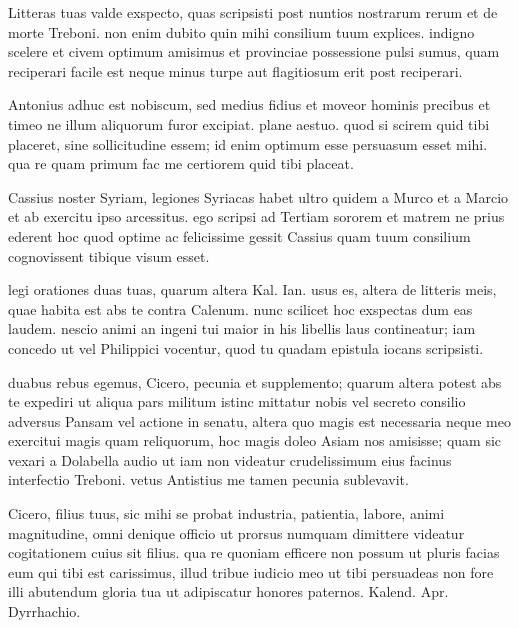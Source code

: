 


 Litteras tuas valde exspecto, quas scripsisti post nuntios nostrarum rerum et de morte Treboni. non enim dubito quin mihi consilium tuum explices. indigno scelere et civem optimum amisimus et provinciae possessione pulsi sumus, quam reciperari facile est neque minus turpe aut flagitiosum erit post reciperari.

 Antonius adhuc est nobiscum, sed medius fidius et moveor hominis precibus et timeo ne illum aliquorum furor excipiat. plane aestuo. quod si scirem quid tibi placeret, sine sollicitudine essem; id enim optimum esse persuasum esset mihi. qua re quam primum fac me certiorem quid tibi placeat.

 Cassius noster Syriam, legiones Syriacas habet ultro quidem a Murco et a Marcio et ab exercitu ipso arcessitus. ego scripsi ad Tertiam sororem et matrem ne prius ederent hoc quod optime ac felicissime gessit Cassius quam tuum consilium cognovissent tibique visum esset.

 legi orationes duas tuas, quarum altera Kal. Ian. usus es, altera de litteris meis, quae habita est abs te contra Calenum. nunc scilicet hoc exspectas dum eas laudem. nescio animi an ingeni tui maior in his libellis laus contineatur; iam concedo ut vel Philippici vocentur, quod tu quadam epistula iocans scripsisti.

 duabus rebus egemus, Cicero, pecunia et supplemento; quarum altera potest abs te expediri ut aliqua pars militum istinc mittatur nobis vel secreto consilio adversus Pansam vel actione in senatu, altera quo magis est necessaria neque meo exercitui magis quam reliquorum, hoc magis doleo Asiam nos amisisse; quam sic vexari a Dolabella audio ut iam non videatur crudelissimum eius facinus interfectio Treboni. vetus Antistius me tamen pecunia sublevavit.

 Cicero, filius tuus, sic mihi se probat industria, patientia, labore, animi magnitudine, omni denique officio ut prorsus numquam dimittere videatur cogitationem cuius sit filius. qua re quoniam efficere non possum ut pluris facias eum qui tibi est carissimus, illud tribue iudicio meo ut tibi persuadeas non fore illi abutendum gloria tua ut adipiscatur honores paternos. Kalend. Apr. Dyrrhachio.
